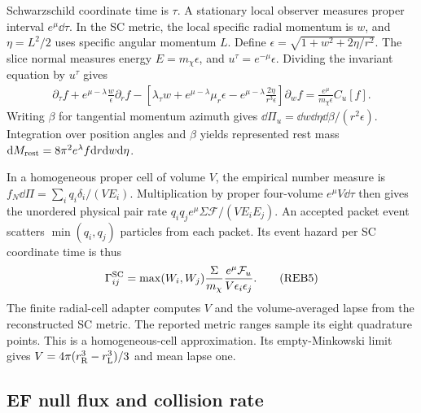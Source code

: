 Schwarzschild coordinate time is \(\tau\). A stationary local observer
measures proper interval \(e^\mu\dd\tau\). In the SC metric, the local
specific radial momentum is \(w\), and
\(\eta=L^2/2\) uses specific angular momentum \(L\). Define
\(\epsilon=\sqrt{1+w^2+2\eta/r^2}\). The slice normal measures energy
\(E=m_\chi\epsilon\), and \(u^\tau=e^{-\mu}\epsilon\).
Dividing the invariant equation by \(u^\tau\) gives
\[
 \begin{split}
 \partial_\tau f
 +e^{\mu-\lambda}\frac{w}{\epsilon}\partial_r f
 -\left[\lambda_\tau w+e^{\mu-\lambda}\mu_r\epsilon
       -e^{\mu-\lambda}\frac{2\eta}{r^3\epsilon}\right]
       \partial_w f
 =\frac{e^\mu}{m_\chi\epsilon}C_u[f].
 \end{split}\tag{REB4}
\]
Writing \(\beta\) for tangential momentum azimuth gives
\(\dd\Pi_u=\dd w\dd\eta\dd\beta/(r^2\epsilon)\).
Integration over position angles and \(\beta\) yields represented rest
mass \(\mathrm d M_{\rm rest}=8\pi^2e^\lambda f\mathrm d r\mathrm d w\mathrm d\eta\).

In a homogeneous proper cell of volume \(V\), the empirical number
measure is \(f_N\dd\Pi=\sum_i q_i\delta_i/(VE_i)\). Multiplication
by proper four-volume \(e^\mu V\dd\tau\) then gives the unordered
physical pair rate \(q_iq_j e^\mu\Sigma\mathcal F/(VE_iE_j)\).
An accepted packet event scatters \(\min(q_i,q_j)\) particles from each
packet. Its event hazard per SC coordinate time is thus
\[
 \Gamma_{ij}^{\rm SC}
 =\max(W_i,W_j)\frac{\Sigma}{m_\chi}
   \frac{e^\mu\mathcal F_u}{V\epsilon_i\epsilon_j}.
 \tag{REB5}
\]
The finite radial-cell adapter computes \(V\) and the volume-averaged
lapse from the reconstructed SC metric. The reported metric ranges sample
its eight quadrature points. This is a homogeneous-cell approximation.
Its empty-Minkowski limit gives
\(V=4\pi(r_{\rm R}^3-r_{\rm L}^3)/3\) and mean lapse one.

\subsection{EF null flux and collision rate}

